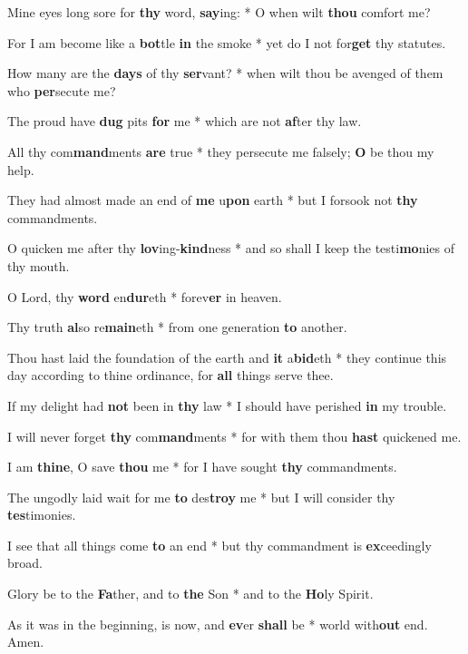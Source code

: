 \begin{multicols}{2}
	Mine eyes long sore for \textbf{thy} word, \textbf{say}ing: * O when wilt \textbf{thou} comfort me?
	
	For I am become like a \textbf{bot}tle \textbf{in} the smoke * yet do I not for\textbf{get} thy statutes.
	
	How many are the \textbf{days} of thy \textbf{ser}vant? * when wilt thou be avenged of them who \textbf{per}secute me?
	
	The proud have \textbf{dug} pits \textbf{for} me * which are not \textbf{af}ter thy law.
	
	All thy com\textbf{mand}ments \textbf{are} true * they persecute me falsely; \textbf{O} be thou my help.
	
	They had almost made an end of \textbf{me} u\textbf{pon} earth * but I forsook not \textbf{thy} commandments.
	
	O quicken me after thy \textbf{lov}ing-\textbf{kind}ness * and so shall I keep the testi\textbf{mo}nies of thy mouth.
	
	O Lord, thy \textbf{word} en\textbf{dur}eth * forev\textbf{er} in heaven.
	
	Thy truth \textbf{al}so re\textbf{main}eth * from one generation \textbf{to} another.
	
	Thou hast laid the foundation of the earth and \textbf{it} a\textbf{bid}eth * they continue this day according to thine ordinance, for \textbf{all} things serve thee.
	
	If my delight had \textbf{not} been in \textbf{thy} law * I should have perished \textbf{in} my trouble.
	
	I will never forget \textbf{thy} com\textbf{mand}ments * for with them thou \textbf{hast} quickened me.
	
	I am \textbf{thine}, O save \textbf{thou} me * for I have sought \textbf{thy} commandments.
	
	The ungodly laid wait for me \textbf{to} des\textbf{troy} me * but I will consider thy \textbf{tes}timonies.
	
	I see that all things come \textbf{to} an end * but thy commandment is \textbf{ex}ceedingly broad.
	
	Glory be to the \textbf{Fa}ther, and to \textbf{the} Son * and to the \textbf{Ho}ly Spirit.
	
	As it was in the beginning, is now, and \textbf{ev}er \textbf{shall} be * world with\textbf{out} end. Amen.
\end{multicols}